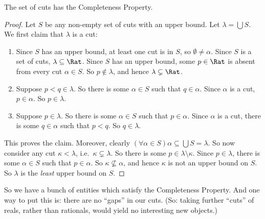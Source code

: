 \documentclass[../../../include/open-logic-section]{subfiles}
\begin{document}
\begin{thm}
The set of cuts has the Completeness Property. 
\end{thm}

\begin{proof}
Let $S$ be any non-empty set of cuts with an upper bound. Let $\lambda
= \bigcup S$. 
We first claim that $\lambda$ is a cut:
\begin{enumerate}
\item Since $S$ has an upper bound, at least one cut is in $S$, so
$\emptyset \neq \alpha$. Since $S$ is a set of cuts, $\lambda
\subseteq \Rat$. Since $S$ has an upper bound, some $p \in \Rat$ is
absent from every cut $\alpha \in S$. So $p\notin \lambda$, and hence
$\lambda \subsetneq \Rat$.
\item Suppose $p < q \in \lambda$. So there is some $\alpha \in S$
such that $q \in \alpha$. Since $\alpha$ is a cut, $p \in \alpha$. So
$p \in \lambda$.
\item Suppose $p \in \lambda$. So there is some $\alpha \in S$ such
that $p \in \alpha$. Since $\alpha$ is a cut, there is some $q \in
\alpha$ such that $p < q$. So $q \in \lambda$. 
\end{enumerate}
This proves the claim. Moreover, clearly $(\forall \alpha \in S)\alpha
\subseteq \bigcup S = \lambda$. So now consider any cut $\kappa <
\lambda$, i.e.\ $\kappa \subsetneq \lambda$. So there is some $p \in
\lambda \setminus \kappa$. Since $p \in \lambda$, there is some
$\alpha \in S$ such that $p \in \alpha$. So $\kappa \nsubseteq
\alpha$, and hence $\kappa$ is not an upper bound on $S$. So $\lambda$
is the \emph{least} upper bound on $S$.
\end{proof}

So we have a bunch of entities which satisfy the Completeness
Property. And one way to put this is: there are no ``gaps'' in our
cuts. (So: taking further ``cuts'' of reals, rather than rationals,
would yield no interesting new objects.)
\end{document}
